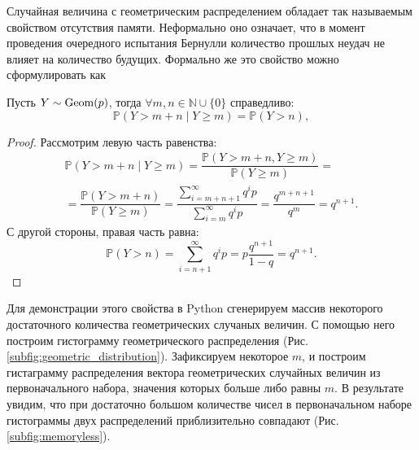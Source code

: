 Случайная величина с геометрическим распределением обладает так называемым
 свойством отсутствия памяти. Неформально оно означает, что в момент проведения
 очередного испытания Бернулли количество прошлых неудач не влияет на количество
 будущих. Формально же это свойство можно сформулировать как
\newtheorem{stat}{Утверждение}
\begin{statement}
	Пусть $Y \sim \operatorname{\mathrm{Geom}}(p)$, тогда $\forall m,n \in \mathbb{N} \cup 
     \{0\}$ справедливо:
	$$ 
     \mathbb{P}(Y > m + n \mid Y \ge m) = \mathbb{P}(Y > n),
     $$
\end{statement}
\begin{proof} Рассмотрим левую часть равенства:
     \begin{multline*}
          \mathbb{P}(Y > m + n \mid Y \ge m) = \dfrac{\mathbb{P}
          (Y > m + n, Y \ge m)}{\mathbb{P}(Y \ge m)} = \\
          = \dfrac{\mathbb{P}(Y > m + n)}{\mathbb{P}(Y \ge m)} = 
          \dfrac{\displaystyle\sum_{i = m + n + 1}^\infty q^i p}
          {\displaystyle\sum_{i = m}^\infty q^i p} = \dfrac{q^{m + n + 1}}{q^m} =
          q^{n + 1}.
     \end{multline*}
     С другой стороны, правая часть равна:
     $$ 
     \mathbb{P}(Y > n) = \sum_{i = n + 1}^\infty q^i p = p \dfrac{q^{n + 1}}
     {1 - q} = q^{n + 1}.
     $$
\end{proof}

Для демонстрации этого свойства в Python сгенерируем массив некоторого
 достаточного количества геометрических случаных величин. С помощью него
 построим гистограмму геометрического распределения (Рис. \eqref{subfig:geometric_distribution}). Зафиксируем некоторое $m$,
 и построим гистаграмму распределения вектора геометрических случайных
 величин из первоначального набора, значения которых больше либо равны $m$.
 В результате увидим, что при достаточно большом количестве чисел в первоначальном
 наборе гистограммы двух распределений приблизительно совпадают (Рис. \eqref{subfig:memoryless}). 

